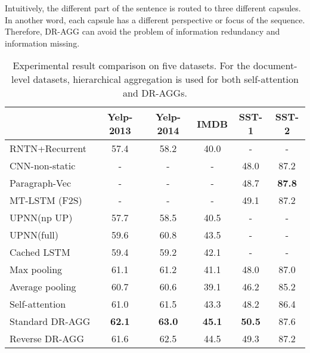 \documentclass[11pt]{article}
\begin{document}
Intuitively, the different part of the sentence is routed to three different capsules. In another word, each capsule has a different perspective or focus of the sequence. Therefore, DR-AGG can avoid  the problem of information redundancy and information missing.

\label{exp}

\begin{table}[t!] \centering \begin{tabular}{lccccc}
    \toprule
&\textbf{Yelp-2013} &\textbf{Yelp-2014} &\textbf{IMDB} & \textbf{SST-1}  &\textbf{SST-2}  \\
    \midrule
RNTN+Recurrent~\cite{socher2013recursive} &57.4	&58.2	&40.0	&-	&-	\\
CNN-non-static~\cite{kim2014convolutional}&-		&-		&- 		&48.0	&87.2	 \\
Paragraph-Vec~\cite{le2014distributed}  	& -		& - 	& - 	& 48.7 & \textbf{87.8}   \\
MT-LSTM (F2S)~\cite{DBLP:conf/emnlp/LiuQCWH15} &- &- 	&- 		&49.1 	&87.2  \\
UPNN(np UP)~\cite{tang2015learning} 		&57.7	&58.5	&40.5	&- 	&-  \\
UPNN(full)~\cite{tang2015learning} 		& 59.6	&60.8 	& 43.5 &-  &-   \\
Cached LSTM~\cite{DBLP:journals/corr/XuCQH16}  &59.4  &59.2  &42.1  &- &-  \\
\midrule
Max pooling         	&61.1              &61.2              &41.1              &48.0               &87.0      \\
Average pooling         &60.7              &60.6              &39.1              &46.2               &85.2      \\
Self-attention       &61.0              &61.5 		 	   &43.3 			   &48.2		         &86.4		 \\

\midrule
Standard DR-AGG         &\textbf{62.1} &\textbf{63.0} &\textbf{45.1} &\textbf{50.5}  &87.6 \\
Reverse DR-AGG &61.6          &62.5          &44.5          &49.3 			 &87.2 \\
    \bottomrule
\end{tabular}
\caption{Experimental result comparison on five datasets. For the document-level datasets, hierarchical aggregation is used for both self-attention and DR-AGGs.}
\label{tab:results}
\end{table}
\end{document}

